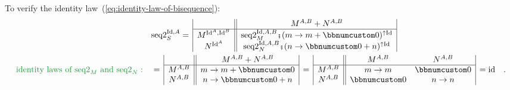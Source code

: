 To verify the identity law~(\ref{eq:identity-law-of-bisequence}):
\begin{align*}
 & \text{seq2}_{S}^{\text{Id},A}=\,\begin{array}{|c||c|}
 & M^{A,B}+N^{A,B}\\
\hline M^{\text{Id}^{A},\text{Id}^{B}} & \text{seq2}_{M}^{\text{Id},A,B}\bef(m\rightarrow m+\bbnum 0)^{\uparrow\text{Id}}\\
N^{\text{Id}^{A}} & \text{seq2}_{N}^{\text{Id},A,B}\bef(n\rightarrow\bbnum 0+n)^{\uparrow\text{Id}}
\end{array}\\
{\color{greenunder}\text{identity laws of }\text{seq2}_{M}\text{ and }\text{seq2}_{N}:}\quad & =\,\begin{array}{|c||c|}
 & M^{A,B}+N^{A,B}\\
\hline M^{A,B} & m\rightarrow m+\bbnum 0\\
N^{A,B} & n\rightarrow\bbnum 0+n
\end{array}\,=\,\begin{array}{|c||cc|}
 & M^{A,B} & N^{A,B}\\
\hline M^{A,B} & m\rightarrow m & \bbnum 0\\
N^{A,B} & \bbnum 0 & n\rightarrow n
\end{array}\,=\text{id}\quad.
\end{align*}

